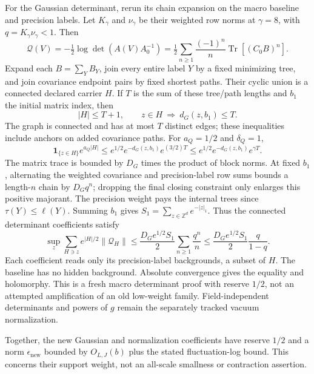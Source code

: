\documentclass[11pt]{article}
\theoremstyle{remark}
\begin{document}
For the Gaussian determinant, rerun its chain expansion on
the macro baseline and precision labels. Let $K_\gamma$
and $\nu_\gamma$ be their weighted row norms at $\gamma=8$,
with $q=K_\gamma\nu_\gamma<1$. Then
\begin{equation}\label{ag-det-series}
 \mathcal Q(V)=-\tfrac12\log\det(A(V)A_0^{-1})
   =\tfrac12\sum_{n\ge1}\frac{(-1)^n}{n}
                        \operatorname{Tr}[(C_0B)^n].
\end{equation}
Expand each $B=\sum_YB_Y$, join every entire label $Y$ by
a fixed minimizing tree, and join covariance endpoint pairs
by fixed shortest paths. Their cyclic union is a connected
declared carrier $H$. If $T$ is the sum of these tree/path
lengths and $b_1$ the initial matrix index, then
\begin{equation}\label{ag-det-geometry}
 |H|\le T+1,\qquad z\in H\ \Longrightarrow\ d_G(z,b_1)\le T.
\end{equation}
The graph is connected and has at most $T$ distinct edges;
these inequalities include anchors on added covariance paths.
For $a_Q=1/2$ and $\delta_Q=1$,
\[
 \mathbf1_{\{z\in H\}}e^{a_Q|H|}
 \le e^{1/2}e^{-d_G(z,b_1)}e^{(3/2)T}
 \le e^{1/2}e^{-d_G(z,b_1)}e^{\gamma T}.
\]
The matrix trace is bounded by $D_G$ times the product of
block norms. At fixed $b_1$, alternating the weighted
covariance and precision-label row sums bounds a length-$n$
chain by $D_Gq^n$; dropping the final closing constraint
only enlarges this positive majorant. The precision weight
pays the internal trees since $\tau(Y)\le\ell(Y)$.
Summing $b_1$ gives $S_1=\sum_{z\in\mathbb Z^d}e^{-|z|_1}$.
Thus the connected determinant coefficients satisfy
\begin{equation}\label{ag-det-bound}
 \sup_z\sum_{H\ni z}e^{|H|/2}\|\mathcal Q_H\|
 \le\frac{D_Ge^{1/2}S_1}{2}\sum_{n\ge1}\frac{q^n}{n}
 \le\frac{D_Ge^{1/2}S_1}{2}\frac q{1-q}.
\end{equation}
Each coefficient reads only its precision-label backgrounds,
a subset of $H$. The baseline has no hidden background.
Absolute convergence gives the equality and holomorphy.
This is a fresh macro determinant proof with reserve $1/2$,
not an attempted amplification of an old low-weight family.
Field-independent determinants and powers of $g$ remain
the separately tracked vacuum normalization.

Together, the new Gaussian and normalization coefficients
have reserve $1/2$ and a norm $\epsilon_{\mathrm{new}}$
bounded by $O_{L,J}(b)$ plus the stated fluctuation-log bound.
This concerns their support weight, not an all-scale
smallness or contraction assertion.
\end{document}
